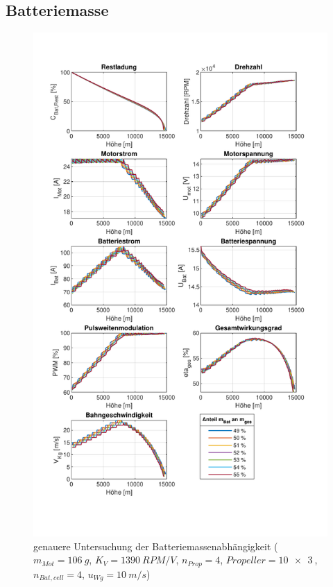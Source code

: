 \begin{appendix}
\section{Batteriemasse}
\begin{figure}[H]
\centering
	\includegraphics[scale=0.85]{Diagramme/Batteriemasse_genauer.pdf}
	\caption{genauere Untersuchung der Batteriemassenabhängigkeit (\ensuremath{m_{Mot}=\SI{106}{g}}, \ensuremath{K_V=\SI{1390}{RPM/V}}, \ensuremath{n_{Prop}=4}, \ensuremath{Propeller=\SI{10x3}{}}, \ensuremath{n_{Bat,cell}=4}, \ensuremath{u_{Wg}=\SI{10}{m/s}})}
	\label{abb:batteriemasse_genauer}
\end{figure}


\end{appendix}
